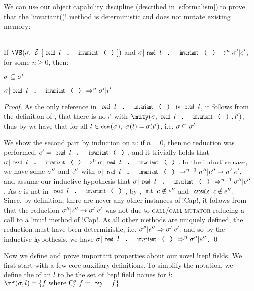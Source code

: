 	\LS
		We can use our object capability discipline (described in \autoref{s:formalism}) to prove that the \Q!invariant()! method is deterministic and does not mutate existing memory:%
	
\SS\begin{Lemma}[Determinism]\ \\
	\indent If $\VS(\s, \E[\invariant{l}])$ and $\s|\invariant{l} \rightarrow^{n} \s'|e'$, for some $n \geq 0$, then:
	\begin{iitemize}
		\item $\sigma \subseteq \sigma'$\SS
		\item $\s|\invariant{l} \Rightarrow^{n} \s'|e'$
	\end{iitemize}
	\end{Lemma}\SS
	\begin{proof}
	As the only reference in $\invariant{l}$ is $\Kw{read}\,l$, it follows from the definition of \muty, that there is no $l'$ with $\muty(\s, \invariant{l}, l')$, thus by  we have that for all $l \in \dom(\s)$, $\sigma(l) = \sigma(l')$, i.e. $\sigma \subseteq \sigma'$

	We show the second part by induction on $n$: if $n = 0$, then no reduction was performed, $e' = \invariant{l}$, and it trivially holds that $\s|\invariant{l} \Rightarrow^{0} \s|\invariant{l}$. In the inductive case, we have some $\sigma''$ and ${\mathit{e}}''$ with $\s|\invariant{l} \rightarrow^{n - 1} \s''|e'' \rightarrow \s'|e'$, and assume our inductive hypothesis that $\s|\invariant{l} \Rightarrow^{n - 1} \s''|e''$.
	As $c$ is not \muty in $\invariant{l}$, by , $\Kw{mut}\,c \notin e''$ and $\Kw{capsule}\,c \notin e''$. Since, by definition, there are never any other instances of \Q!Cap!, it follows from  that the reduction $\sigma''|{\mathit{e}}'' \rightarrow \sigma'|e'$ was not due to \textsc{call/call mutator} reducing a call to a \Q!mut! method of \Q!Cap!.
	As all other methods are uniquely defined, the reduction must have been deterministic, i.e.  $\sigma''|{\mathit{e}}'' \Rightarrow \sigma'|e'$, and so by the inductive hypothesis, we have $\s|\invariant{l} \Rightarrow^{n} \s''|e''$.
	\qed\end{proof}

Now we define and prove important properties about our novel \Q!rep! fields. We first start with a few core auxiliary definitions.
To simplify the notation, we define the \rf of an $l$ to be the set of \Q!rep! field names for $l$:\\
\indent $\rf(\s,l) = \{f  \text{ where } \C{l}.f = \field{\Kw{rep}}{\_}{f}\}$
\LS

